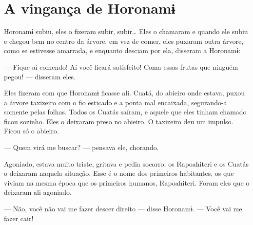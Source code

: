 \chapter{A vingança de Horonamɨ}
 
 

Horonamɨ subiu, eles o fizeram subir, subir… Eles o chamaram e
quando ele subiu e chegou bem no centro da árvore, em vez de comer, eles
puxaram outra árvore, como se estivesse amarrada, e enquanto desciam por
ela, disseram a Horonamɨ:

--- Fique aí comendo! Aí você ficará satisfeito! Coma essas frutas que
ninguém pegou! --- disseram eles.

Eles fizeram com que Horonamɨ ficasse ali. Cuatá, do abieiro onde
 estava, puxou a árvore taxizeiro com o fio esticado e a ponta mal
 encaixada, segurando-a somente pelas folhas. Todos os Cuatás saíram, e
 aquele que eles tinham chamado ficou sozinho. Eles o deixaram preso no
 abieiro. O taxizeiro deu um impulso. Ficou só o abieiro.


--- Quem virá me buscar? --- pensava ele, chorando. 

Agoniado, estava muito triste, gritava e pedia socorro;
os Rapoahiteri e os Cuatás o deixaram naquela
situação. Esse é o nome dos primeiros habitantes, os que viviam
na mesma época que os primeiros humanos, Rapoahiteri. Foram eles que o
deixaram ali agoniado. 


--- Não, você não vai me fazer descer direito --- disse
Horonamɨ. --- Você vai me fazer cair! 


